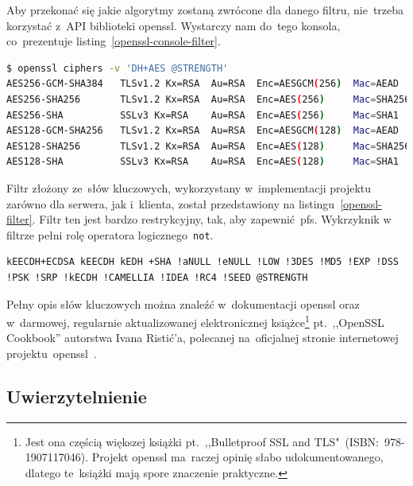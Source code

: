 \documentclass[thesis]{subfiles}
\begin{document}
Aby przekonać się jakie algorytmy zostaną zwrócone dla danego filtru, nie~trzeba korzystać z~API biblioteki \gls{openssl}. Wystarczy nam do~tego konsola, co~prezentuje listing~\ref{openssl-console-filter}.\\

\begin{lstlisting}[numbers=none,language=bash,caption={Wynik filtrowania zestawów algorytmów w~konsoli za~pomocą \gls{openssl}},label=openssl-console-filter]
$ openssl ciphers -v 'DH+AES @STRENGTH'
AES256-GCM-SHA384   TLSv1.2 Kx=RSA  Au=RSA  Enc=AESGCM(256)  Mac=AEAD
AES256-SHA256       TLSv1.2 Kx=RSA  Au=RSA  Enc=AES(256)     Mac=SHA256
AES256-SHA          SSLv3 Kx=RSA    Au=RSA  Enc=AES(256)     Mac=SHA1
AES128-GCM-SHA256   TLSv1.2 Kx=RSA  Au=RSA  Enc=AESGCM(128)  Mac=AEAD
AES128-SHA256       TLSv1.2 Kx=RSA  Au=RSA  Enc=AES(128)     Mac=SHA256
AES128-SHA          SSLv3 Kx=RSA    Au=RSA  Enc=AES(128)     Mac=SHA1
\end{lstlisting}

Filtr złożony ze~słów kluczowych, wykorzystany w~implementacji projektu zarówno dla serwera, jak i~klienta, został przedstawiony na listingu~\ref{openssl-filter}. Filtr ten jest bardzo restrykcyjny, tak, aby zapewnić~\gls{pfs}. Wykrzyknik w filtrze pełni rolę operatora logicznego~\texttt{not}.\\

\begin{lstlisting}[numbers=none,caption={Filtr \gls{openssl} dla algorytmów użytych w~projekcie},label=openssl-filter]
kEECDH+ECDSA kEECDH kEDH +SHA !aNULL !eNULL !LOW !3DES !MD5 !EXP !DSS !PSK !SRP !kECDH !CAMELLIA !IDEA !RC4 !SEED @STRENGTH
\end{lstlisting}

Pełny opis słów kluczowych można znaleźć w~dokumentacji \gls{openssl} oraz w~darmowej, regularnie aktualizowanej elektronicznej książce\footnote{Jest ona częścią większej książki pt.~,,Bulletproof SSL and TLS"~(ISBN:~978-1907117046). Projekt \gls{openssl} ma~raczej opinię słabo udokumentowanego, dlatego te~książki mają spore znaczenie praktyczne.} pt.~,,OpenSSL Cookbook'' autorstwa Ivana Ristić'a, polecanej na~oficjalnej stronie internetowej projektu~\gls{openssl}~\cite{openssl-cookbook-suites}.


\subsection{Uwierzytelnienie}
\end{document}
